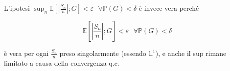 \documentclass{article}
\begin{document}
L'ipotesi $\sup_n \mathbb{E}\left[\left|\frac{S_n}{n}\right|;G\right] < \varepsilon \ \ \ \forall \mathbb{P}(G)<\delta $ è invece vera perché

\[\mathbb{E}\left[\left|\frac{S_n}{n}\right|;G\right] < \varepsilon \ \ \ \forall \mathbb{P}(G)<\delta \]

è vera per ogni $\frac{S_n}{n}$ preso singolarmente (essendo $\mathbb{L}^1$), e anche il sup rimane limitato a causa della convergenza q.c.






\end{document}
